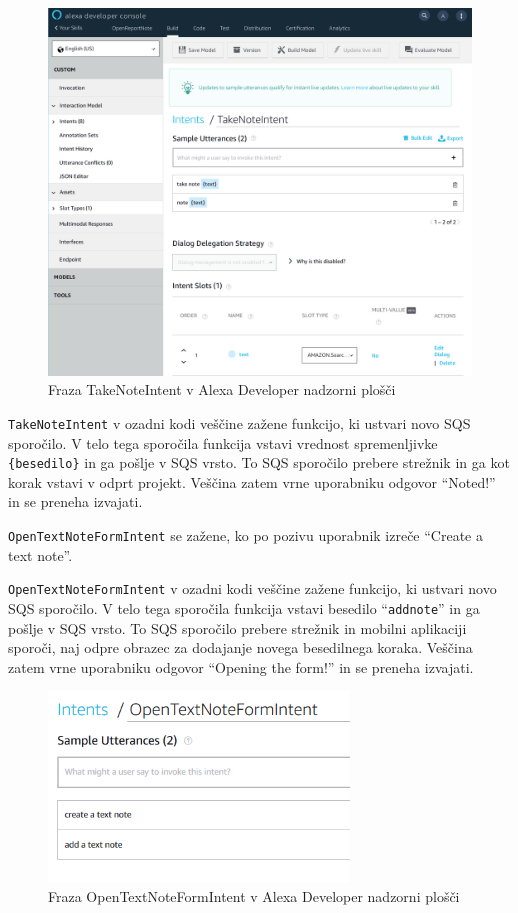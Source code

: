 \documentclass[a4paper, 12pt]{book}
\begin{document}
\begin{figure}[H]
\begin{center}
\includegraphics[width=13cm]{intent_literal}
\end{center}
\caption{Fraza TakeNoteIntent v Alexa Developer nadzorni plošči}
\label{TakeNoteIntent}
\end{figure}

\texttt{TakeNoteIntent} v ozadni kodi veščine zažene funkcijo, ki ustvari novo SQS sporočilo.
V telo tega sporočila funkcija vstavi vrednost spremenljivke \texttt{\{besedilo\}} in ga pošlje v SQS vrsto.
To SQS sporočilo prebere strežnik in ga kot korak vstavi v odprt projekt.
Veščina zatem vrne uporabniku odgovor \enquote{Noted!} in se preneha izvajati.

\texttt{OpenTextNoteFormIntent} se zažene, ko po pozivu uporabnik izreče \enquote{Create a text note}.

\texttt{OpenTextNoteFormIntent} v ozadni kodi veščine zažene funkcijo, ki ustvari novo SQS sporočilo.
V telo tega sporočila funkcija vstavi besedilo \enquote{\texttt{addnote}} in ga pošlje v SQS vrsto.
To SQS sporočilo prebere strežnik in mobilni aplikaciji sporoči, naj odpre obrazec za dodajanje novega besedilnega koraka.
Veščina zatem vrne uporabniku odgovor \enquote{Opening the form!} in se preneha izvajati.


\begin{figure}[H]
\begin{center}
\includegraphics[width=8cm]{intent_text}
\end{center}
\caption{Fraza OpenTextNoteFormIntent v Alexa Developer nadzorni plošči}
\label{OpenTextNoteFormIntent}
\end{figure}
\end{document}
